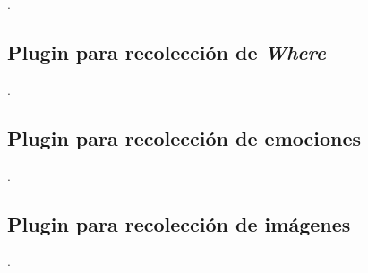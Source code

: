 .


\subsection{Plugin para recolección de \textit{Where}}

.


\subsection{Plugin para recolección de emociones}

.



\subsection{Plugin para recolección de imágenes}

\lstset{style=/Style/ROS/MSG}


.


